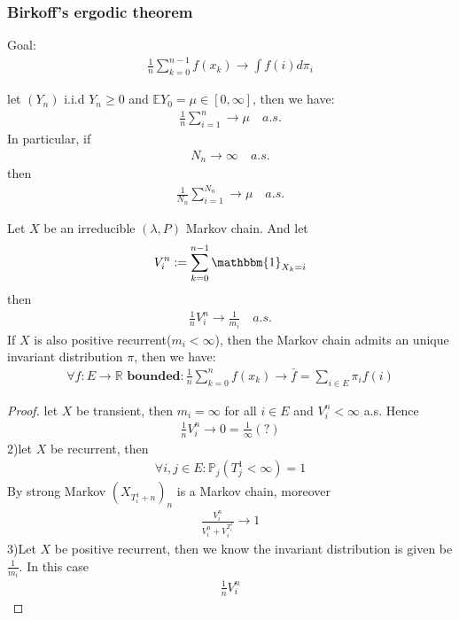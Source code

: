 \subsubsection*{Birkoff's ergodic theorem}
Goal:
\begin{align*}
	\frac{1}{n} \sum_{k= 0}^{n-1} f(x_k) \rightarrow \int f(i)d \pi_i
\end{align*}

\begin{lemma}
	let $(Y_n)$ i.i.d $Y_n \ge 0$ and $\mathbb{E}Y_0 = \mu \in [0, \infty]$, then we have:
	\begin{align*}
		\frac{1}{n}\sum_{i = 1}^n \rightarrow \mu \quad a.s.
	\end{align*}
	In particular, if 
	\begin{align*}
		N_n \rightarrow \infty \quad a.s.
	\end{align*}
	then 
	\begin{align*}
	\frac{1}{N_n} \sum_{i = 1}^{N_n} \rightarrow \mu \quad a.s.
	\end{align*}
\end{lemma}

\begin{theorem}
	Let $X$ be an irreducible $(\lambda, P)$ Markov chain. And let 
	\begin{align*}
		V_i^n := \sum_{k = 0}^{n -1} \mathbbm{1}_{X_k = i}
	\end{align*}
	then 
	\begin{align*}
		\frac{1}{n} V_i^n \rightarrow \frac{1}{m_i} \quad a.s.
	\end{align*}
	If $X$ is also positive recurrent($m_i < \infty$), then the Markov chain admits an unique invariant distribution $\pi$, then we have:
	\begin{align*}
		\forall f :E \rightarrow \mathbb{R} \textbf{ bounded}: \frac{1}{n} \sum_{k = 0}^n f(x_k) \rightarrow \bar{f} = \sum_{i \in E} \pi_i f(i)
	\end{align*}
\end{theorem}
\begin{proof}
	let $X$ be transient, then $m_i = \infty$ for all $i \in E$ and $V_i^n < \infty$ a.s. Hence
	\begin{align*}
		\frac{1}{n} V_i^n \rightarrow 0 = \frac{1}{\infty}(?)
	\end{align*}
	2)let $X$ be recurrent, then 
	\begin{align*}
		\forall i, j \in E :\mathbb{P}_j(T_j^1 < \infty) = 1 
	\end{align*}
	By strong Markov $(X_{T_i^1+ n})_n$ is a Markov chain, moreover
	\begin{align*}
		\frac{V_i^n}{V_i^n + V_i^{T_i^1}} \rightarrow 1
	\end{align*}
	3)Let $X$ be positive recurrent, then we know the invariant distribution is given be $\frac{1}{m_i}$. In this case 
	\begin{align*}
		\frac{1}{n} V_i^n
	\end{align*}
\end{proof}




